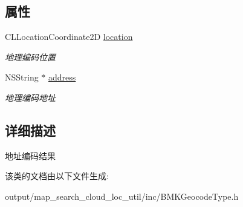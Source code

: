 \subsection*{属性}
\begin{DoxyCompactItemize}
\item 
\hypertarget{interface_b_m_k_geo_code_result_a4f2aaf9561f955a26979d388557ff31b}{C\+L\+Location\+Coordinate2\+D \hyperlink{interface_b_m_k_geo_code_result_a4f2aaf9561f955a26979d388557ff31b}{location}}\label{interface_b_m_k_geo_code_result_a4f2aaf9561f955a26979d388557ff31b}

\begin{DoxyCompactList}\small\item\em 地理编码位置 \end{DoxyCompactList}\item 
\hypertarget{interface_b_m_k_geo_code_result_a828c8d7063323c1540e9d66bdf0df22c}{N\+S\+String $\ast$ \hyperlink{interface_b_m_k_geo_code_result_a828c8d7063323c1540e9d66bdf0df22c}{address}}\label{interface_b_m_k_geo_code_result_a828c8d7063323c1540e9d66bdf0df22c}

\begin{DoxyCompactList}\small\item\em 地理编码地址 \end{DoxyCompactList}\end{DoxyCompactItemize}


\subsection{详细描述}
地址编码结果 

该类的文档由以下文件生成\+:\begin{DoxyCompactItemize}
\item 
output/map\+\_\+search\+\_\+cloud\+\_\+loc\+\_\+util/inc/B\+M\+K\+Geocode\+Type.\+h\end{DoxyCompactItemize}
